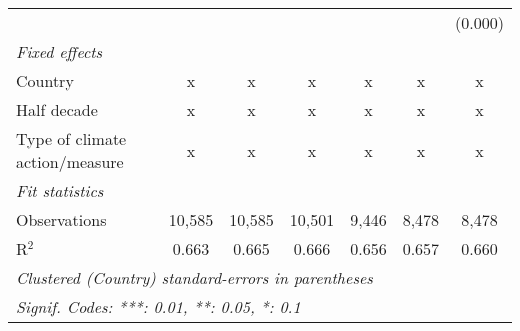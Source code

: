\begin{tabular}{lcccccc}
                                                  &         &                &                &                &                & (0.000)\\   
   \emph{Fixed effects}\\
   Country                                        & x       & x              & x              & x              & x              & x\\  
   Half decade                                    & x       & x              & x              & x              & x              & x\\  
   Type of climate action/measure                 & x       & x              & x              & x              & x              & x\\  
   \midrule \emph{Fit statistics}\\
   Observations                                   & 10,585  & 10,585         & 10,501         & 9,446          & 8,478          & 8,478\\  
   R$^2$                                          & 0.663   & 0.665          & 0.666          & 0.656          & 0.657          & 0.660\\  
   \midrule
   \multicolumn{7}{l}{\emph{Clustered (Country) standard-errors in parentheses}}\\
   \multicolumn{7}{l}{\emph{Signif. Codes: ***: 0.01, **: 0.05, *: 0.1}}\\
\end{tabular}
\par\endgroup


